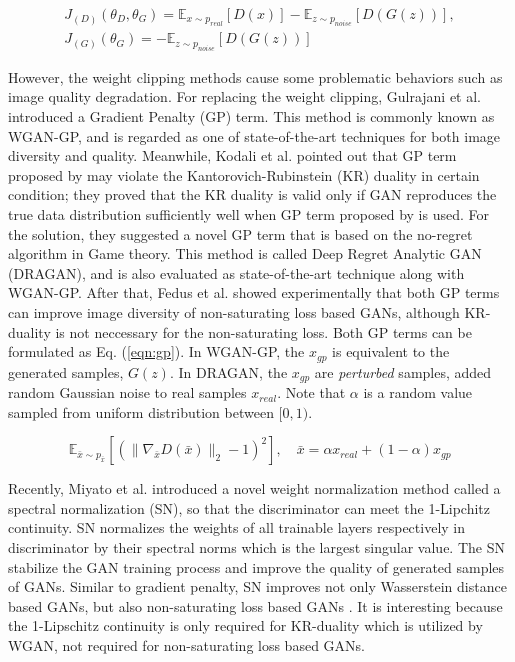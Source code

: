 \documentclass[runningheads]{llncs}
\begin{document}
\vspace*{-4mm}
\begin{equation}
\begin{split}
     J_{(D)}(\theta_{D},\theta_{G})=
        \mathbb{E}_{x\sim p_{real}}[D(x)]
        -\mathbb{E}_{z\sim p_{noise}}[D(G(z))], 
        \\ J_{(G)}(\theta_{G})
        =
        -\mathbb{E}_{z\sim p_{noise}}[D(G(z))]\label{eqn:wgan}
        \end{split}
\end{equation}

However, the weight clipping methods cause some problematic behaviors such as image quality degradation. For replacing the weight clipping, Gulrajani et al. \cite{gulrajani2017improved} introduced a Gradient Penalty (GP) term. This method is commonly known as WGAN-GP, and is regarded as one of state-of-the-art techniques for both image diversity and quality. Meanwhile, Kodali et al. \cite{kodali2017dragan} pointed out that GP term proposed by \cite{gulrajani2017improved} may violate the Kantorovich-Rubinstein (KR) duality in certain condition; they proved that the KR duality is valid only if GAN reproduces the true data distribution sufficiently well when GP term proposed by \cite{gulrajani2017improved} is used. For the solution, they suggested a novel GP term that is based on the no-regret algorithm in Game theory. This method is called Deep Regret Analytic GAN (DRAGAN), and is also evaluated as state-of-the-art technique along with WGAN-GP. After that, Fedus et al. \cite{fedus2017many} showed experimentally that both GP terms can improve image diversity of non-saturating loss based GANs, although KR-duality is not neccessary for the non-saturating loss. Both GP terms can be formulated as Eq. (\ref{eqn:gp}). In WGAN-GP, the $x_{gp}$ is equivalent to the generated samples, $G(z)$. In DRAGAN, the $x_{gp}$ are \emph{perturbed} samples, added random Gaussian noise to real samples $x_{real}$. Note that $\alpha$ is a random value sampled from uniform distribution between $[0,1)$.

\vspace*{-2mm}
\begin{equation}
\mathbb{E}_
{\bar{x}\sim p_{\bar{x}}}
[( \parallel \nabla_{\bar{x}} D(\bar{x}) \parallel_2 -1)^2]
,
\quad
\bar{x}=\alpha x_{real}+(1-\alpha)x_{gp} \label{eqn:gp}
\end{equation}

Recently, Miyato et al. \cite{miyato2018spectral} introduced a novel weight normalization method called a spectral normalization (SN), so that the discriminator can meet the 1-Lipchitz continuity. SN normalizes the weights of all trainable layers respectively in discriminator by their spectral norms which is the largest singular value. The SN stabilize the GAN training process and improve the quality of generated samples of GANs. Similar to gradient penalty, SN improves not only Wasserstein distance based GANs, but also non-saturating loss based GANs \cite{miyato2018spectral}. It is interesting because the 1-Lipschitz continuity is only required for KR-duality which is utilized by WGAN, not required for non-saturating loss based GANs.
\end{document}

